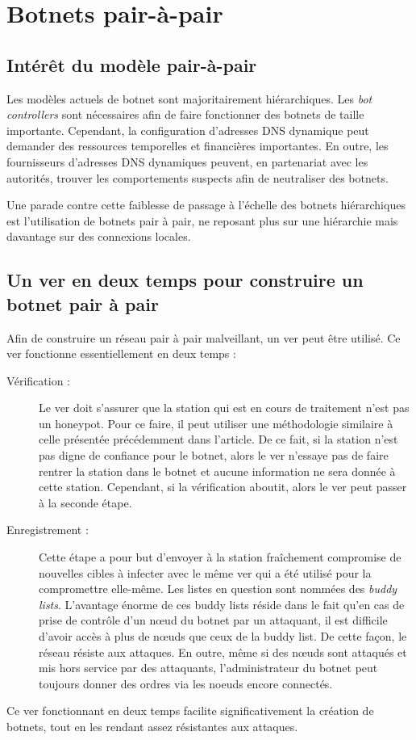 \section{Botnets pair-à-pair}

\subsection{Intérêt du modèle pair-à-pair}

Les modèles actuels de botnet sont majoritairement hiérarchiques. Les
\textit{bot controllers} sont nécessaires afin de faire fonctionner des botnets
de taille importante. Cependant, la configuration d'adresses DNS
dynamique peut demander des ressources temporelles et financières importantes. En
outre, les fournisseurs d'adresses DNS dynamiques peuvent, en partenariat avec
les autorités, trouver les comportements suspects afin de neutraliser des
botnets.

Une parade contre cette faiblesse de passage à l'échelle des botnets
hiérarchiques est l'utilisation de botnets pair à pair, ne reposant plus sur une
hiérarchie mais davantage sur des connexions locales.


\subsection{Un ver en deux temps pour construire un botnet pair à pair}

Afin de construire un réseau pair à pair malveillant, un ver peut être utilisé.
Ce ver fonctionne essentiellement en deux temps :

\begin{description}

\item[Vérification :] Le ver doit s'assurer que la station qui est en cours de
	traitement n'est pas un honeypot. Pour ce faire, il peut utiliser une
	méthodologie similaire à celle présentée précédemment dans l'article. De
	ce fait, si la station n'est pas digne de confiance pour le botnet, alors
	le ver n'essaye pas de faire rentrer la station dans le botnet et aucune
	information ne sera donnée à cette station. Cependant, si la vérification
	aboutit, alors le ver peut passer à la seconde étape.

\item[Enregistrement :] Cette étape a pour but d'envoyer à la station
	fraîchement compromise de nouvelles cibles à infecter avec le même ver
	qui a été utilisé pour la compromettre elle-même. Les listes en question
	sont nommées des \textit{buddy lists}. L'avantage énorme de ces buddy
	lists réside dans le fait qu'en cas de prise de contrôle d'un nœud du
	botnet par un attaquant, il est difficile d'avoir accès à plus de nœuds
	que ceux de la buddy list. De cette façon, le réseau résiste aux
	attaques. En outre, même si des nœuds sont attaqués et mis hors
	service par des attaquants, l'administrateur du botnet peut toujours
	donner des ordres via les noeuds encore connectés.

\end{description}

Ce ver fonctionnant en deux temps facilite significativement la création de
botnets, tout en les rendant assez résistantes aux attaques.
